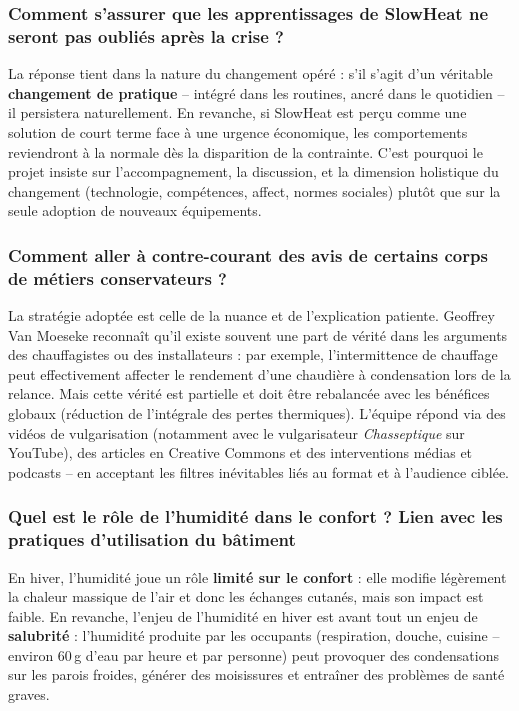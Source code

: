 \subsubsection{Comment s'assurer que les apprentissages de SlowHeat ne seront pas oubliés après la crise ?}

La réponse tient dans la nature du changement opéré : s'il s'agit d'un véritable \textbf{changement de pratique} -- intégré dans les routines, ancré dans le quotidien -- il persistera naturellement. En revanche, si SlowHeat est perçu comme une solution de court terme face à une urgence économique, les comportements reviendront à la normale dès la disparition de la contrainte. C'est pourquoi le projet insiste sur l'accompagnement, la discussion, et la dimension holistique du changement (technologie, compétences, affect, normes sociales) plutôt que sur la seule adoption de nouveaux équipements.

\subsubsection{Comment aller à contre-courant des avis de certains corps de métiers conservateurs ?}

La stratégie adoptée est celle de la nuance et de l'explication patiente. Geoffrey Van Moeseke reconnaît qu'il existe souvent une part de vérité dans les arguments des chauffagistes ou des installateurs : par exemple, l'intermittence de chauffage peut effectivement affecter le rendement d'une chaudière à condensation lors de la relance. Mais cette vérité est partielle et doit être rebalancée avec les bénéfices globaux (réduction de l'intégrale des pertes thermiques). L'équipe répond via des vidéos de vulgarisation (notamment avec le vulgarisateur \textit{Chasseptique} sur YouTube), des articles en Creative Commons et des interventions médias et podcasts -- en acceptant les filtres inévitables liés au format et à l'audience ciblée.

\subsubsection{Quel est le rôle de l'humidité dans le confort ? Lien avec les pratiques d'utilisation du bâtiment}

En hiver, l'humidité joue un rôle \textbf{limité sur le confort} : elle modifie légèrement la chaleur massique de l'air et donc les échanges cutanés, mais son impact est faible. En revanche, l'enjeu de l'humidité en hiver est avant tout un enjeu de \textbf{salubrité} : l'humidité produite par les occupants (respiration, douche, cuisine -- environ 60\,g d'eau par heure et par personne) peut provoquer des condensations sur les parois froides, générer des moisissures et entraîner des problèmes de santé graves.

